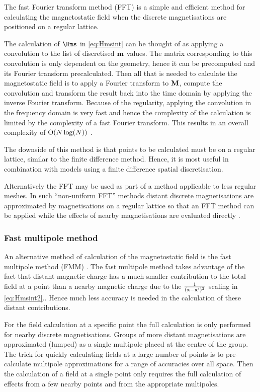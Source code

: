 The fast Fourier transform method (FFT) is a simple and efficient method for calculating the magnetostatic field when the discrete magnetisations are positioned on a regular lattice.

The calculation of $\Hms$ in \cref{eq:Hmsint} can be thought of as applying a convolution to the list of discretised $\boldsymbol{\mathrm{m}}$ values.
The matrix corresponding to this convolution is only dependent on the geometry, hence it can be precomputed and its Fourier transform precalculated.
Then all that is needed to calculate the magnetostatic field is to apply a Fourier transform to $\boldsymbol{\mathrm{M}}$, compute the convolution and transform the result back into the time domain by applying the inverse Fourier transform.
Because of the regularity, applying the convolution in the frequency domain is very fast and hence the complexity of the calculation is limited by the complexity of a fast Fourier transform.
This results in an overall complexity of $\mathrm{O}{\left( N \log(N) \right)}$ \cite{Jones1997}.

The downside of this method is that points to be calculated must be on a regular lattice, similar to the finite difference method.
Hence, it is most useful in combination with models using a finite difference spatial discretisation.

Alternatively the FFT may be used as part of a method applicable to less regular meshes.
In such ``non-uniform FFT'' methods distant discrete magnetisations are approximated by magnetisations on a regular lattice so that an FFT method can be applied while the effects of nearby magnetisations are evaluated directly \cite{Jones1997}.


\subsubsection{Fast multipole method}
\label{sec:fast-mult-meth}

An alternative method of calculation of the magnetostatic field is the fast multipole method (FMM) \cite{Beatson1997}.
The fast multipole method takes advantage of the fact that distant magnetic charge has a much smaller contribution to the total field at a point than a nearby magnetic charge due to the $\frac{1}{(\boldsymbol{\mathrm{x}} - \boldsymbol{\mathrm{x}}')^2}$ scaling in \cref{eq:Hmsint2}..
Hence much less accuracy is needed in the calculation of these distant contributions.

For the field calculation at a specific point the full calculation is only performed for nearby discrete magnetisations.
Groups of more distant magnetisations are approximated (lumped) as a single multipole placed at the centre of the group.
The trick for quickly calculating fields at a large number of points is to pre-calculate multipole approximations for a range of accuracies over all space.
Then the calculation of a field at a single point only requires the full calculation of effects from a few nearby points and from the appropriate multipoles.

